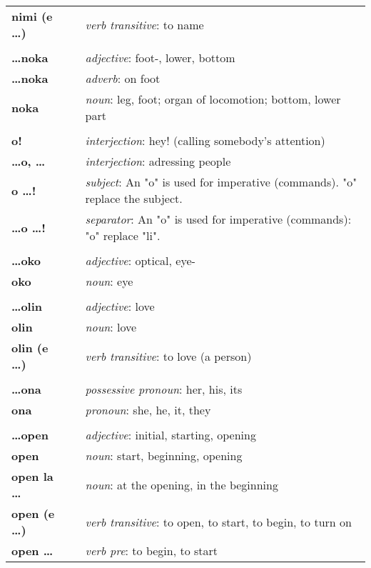 \begin{supertabular}{p{2,5cm}|ll}
\textbf{nimi (e \dots )} && \textit{verb transitive}: to name \\ 
 && \\ %
\textbf{\dots noka} && \textit{adjective}: foot-, lower, bottom \\  
\textbf{ \dots noka } && \textit{adverb}: on foot \\  
\textbf{noka} && \textit{noun}: leg, foot; organ of locomotion; bottom, lower part \\ 
 && \\ %
\textbf{o!} && \textit{interjection}: hey! (calling somebody's attention) \\ 
\textbf{\dots o, \dots} && \textit{interjection}: adressing people \\ 
\textbf{o \dots !} && \textit{subject}: An "o" is used for imperative (commands). "o" replace the subject.  \\ 
\textbf{\dots o \dots !} && \textit{separator}: An "o" is used for imperative (commands): "o" replace "li". \\ 
 && \\ %
\textbf{\dots oko} && \textit{adjective}: optical, eye- \\ 
\textbf{oko} && \textit{noun}: eye \\ 
 && \\ %
\textbf{\dots olin} && \textit{adjective}: love \\ 
\textbf{olin} && \textit{noun}: love \\ 
\textbf{olin (e \dots)} && \textit{verb transitive}: to love (a person) \\ 
 && \\ %
\textbf{\dots ona} && \textit{possessive pronoun}: her, his, its \\  
\textbf{ona} && \textit{pronoun}: she, he, it, they \\ 
 && \\ %
\textbf{\dots open} && \textit{adjective}: initial, starting, opening \\ 
\textbf{open} && \textit{noun}: start, beginning, opening \\ 
\textbf{open la \dots} && \textit{noun}: at the opening, in the beginning  \\ 
\textbf{open (e \dots)} && \textit{verb transitive}: to open, to start, to begin, to turn on \\ 
\textbf{open \dots } && \textit{verb pre}: to begin, to start \\ 

\end{supertabular}
